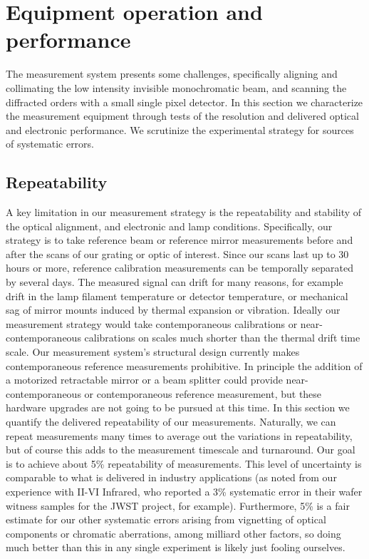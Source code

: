 \section{Equipment operation and performance}
The measurement system presents some challenges, specifically aligning and collimating the low intensity invisible monochromatic beam, and scanning the diffracted orders with a small single pixel detector.  In this section we characterize the measurement equipment through tests of the resolution and delivered optical and electronic performance.  We scrutinize the experimental strategy for sources of systematic errors.

\subsection{Repeatability}
A key limitation in our measurement strategy is the repeatability and stability of the optical alignment, and electronic and lamp conditions.  Specifically, our strategy is to take reference beam or reference mirror measurements before and after the scans of our grating or optic of interest.  Since our scans last up to 30 hours or more, reference calibration measurements can be temporally separated by several days.  The measured signal can drift for many reasons, for example drift in the lamp filament temperature or detector temperature, or mechanical sag of mirror mounts induced by thermal expansion or vibration.  Ideally our measurement strategy would take contemporaneous calibrations or near-contemporaneous calibrations on scales much shorter than the thermal drift time scale.  Our measurement system's structural design currently makes contemporaneous reference measurements prohibitive.  In principle the addition of a motorized retractable mirror or a beam splitter could provide near-contemporaneous or contemporaneous reference measurement, but these hardware upgrades are not going to be pursued at this time.  In this section we quantify the delivered repeatability of our measurements.  Naturally, we can repeat measurements many times to average out the variations in repeatability, but of course this adds to the measurement timescale and turnaround.  Our goal is to achieve about 5\% repeatability of measurements.  This level of uncertainty is comparable to what is delivered in industry applications (as noted from our experience with II-VI Infrared, who reported a 3\% systematic error in their wafer witness samples for the JWST project, for example).  Furthermore, 5\% is a fair estimate for our other systematic errors arising from vignetting of optical components or chromatic aberrations, among milliard other factors, so doing much better than this in any single experiment is likely just fooling ourselves.

